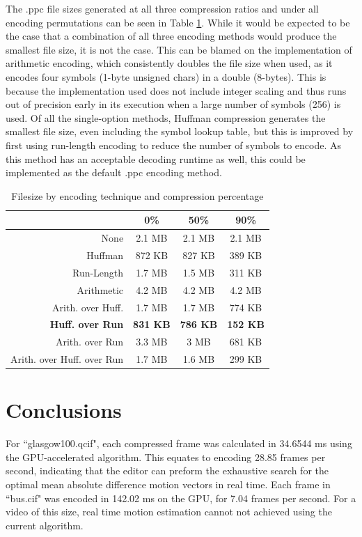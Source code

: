\documentclass[10pt,twocolumn,twoside]{IEEEtran}
\begin{document}
The .ppc file sizes generated at all three compression ratios and under all encoding permutations can be seen in Table \ref{table:filesize}. While it would be expected to be the case that a combination of all three encoding methods would produce the smallest file size, it is not the case. This can be blamed on the implementation of arithmetic encoding, which consistently doubles the file size when used, as it encodes four symbols (1-byte unsigned chars) in a double (8-bytes). This is because the implementation used does not include integer scaling and thus runs out of precision early in its execution when a large number of symbols (256) is used. Of all the single-option methods, Huffman compression generates the smallest file size, even including the symbol lookup table, but this is improved by first using run-length encoding to reduce the number of symbols to encode. As this method has an acceptable decoding runtime as well, this could be implemented as the default .ppc encoding method.

\begin{table}[htdp]
\caption{Filesize by encoding technique and compression percentage}
\vskip -15pt
\label{table:filesize}
\small{
\begin{center}
\begin{tabular}{|r|c|c|c|}
\hline
 & 0\%  & 50\% & 90\% \\
 \hline
 None & 2.1 MB & 2.1 MB & 2.1 MB\\
 \hline
 Huffman & 872 KB & 827 KB & 389 KB\\
 \hline
 Run-Length & 1.7 MB & 1.5 MB & 311 KB\\
 \hline
 Arithmetic & 4.2 MB & 4.2 MB & 4.2 MB\\
 \hline
 Arith. over Huff. & 1.7 MB & 1.7 MB & 774 KB\\
 \hline
 \textbf{Huff. over Run} & \textbf{831 KB} & \textbf{786 KB} & \textbf{152 KB}\\
 \hline
 Arith. over Run & 3.3 MB & 3 MB & 681 KB\\
 \hline
 Arith. over Huff. over Run & 1.7 MB & 1.6 MB & 299 KB\\
 \hline
\end{tabular}
\end{center}
}
\end{table}


\section{Conclusions}
For ``glasgow100.qcif", each compressed frame was calculated in 34.6544 ms using the GPU-accelerated algorithm. This equates to encoding 28.85 frames per second, indicating that the editor can preform the exhaustive search for the optimal mean absolute difference motion vectors in real time. Each frame in ``bus.cif" was encoded in 142.02 ms on the GPU, for 7.04 frames per second. For a video of this size, real time motion estimation cannot not achieved using the current algorithm.
\end{document}
